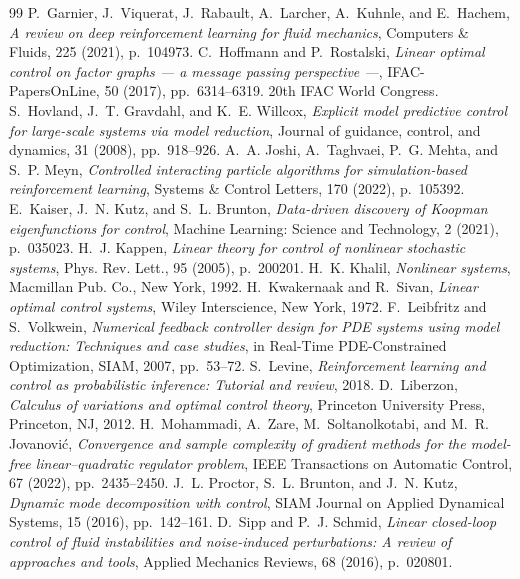 \documentclass[10pt,a4paper]{amsart}
\begin{document}
\begin{thebibliography}{99}
 {\sc P.~Garnier, J.~Viquerat, J.~Rabault, A.~Larcher, A.~Kuhnle, and E.~Hachem}, {\em A review on deep reinforcement learning for fluid mechanics}, Computers \& Fluids, 225 (2021), p.~104973.
 {\sc C.~Hoffmann and P.~Rostalski}, {\em Linear optimal control on factor graphs — a message passing perspective —}, IFAC-PapersOnLine, 50 (2017), pp.~6314--6319. \newblock 20th IFAC World Congress.
 {\sc S.~Hovland, J.~T. Gravdahl, and K.~E. Willcox}, {\em Explicit model predictive control for large-scale systems via model reduction}, Journal of guidance, control, and dynamics, 31 (2008), pp.~918--926.
 {\sc A.~A. Joshi, A.~Taghvaei, P.~G. Mehta, and S.~P. Meyn}, {\em Controlled interacting particle algorithms for simulation-based reinforcement learning}, Systems \& Control Letters, 170 (2022), p.~105392.
 {\sc E.~Kaiser, J.~N. Kutz, and S.~L. Brunton}, {\em Data-driven discovery of {K}oopman eigenfunctions for control}, Machine Learning: Science and Technology, 2 (2021), p.~035023.
 {\sc H.~J. Kappen}, {\em Linear theory for control of nonlinear stochastic systems}, Phys. Rev. Lett., 95 (2005), p.~200201.
 {\sc H.~K. Khalil}, {\em Nonlinear systems}, Macmillan Pub. Co., New York, 1992.
 {\sc H.~Kwakernaak and R.~Sivan}, {\em Linear optimal control systems}, Wiley Interscience, New York, 1972.
 {\sc F.~Leibfritz and S.~Volkwein}, {\em Numerical feedback controller design for {PDE} systems using model reduction: {T}echniques and case studies}, in Real-Time PDE-Constrained Optimization, SIAM, 2007, pp.~53--72.
 {\sc S.~Levine}, {\em Reinforcement learning and control as probabilistic inference: Tutorial and review}, 2018.
 {\sc D.~Liberzon}, {\em Calculus of variations and optimal control theory}, Princeton University Press, Princeton, NJ, 2012.
 {\sc H.~Mohammadi, A.~Zare, M.~Soltanolkotabi, and M.~R. Jovanović}, {\em Convergence and sample complexity of gradient methods for the model-free linear–quadratic regulator problem}, IEEE Transactions on Automatic Control, 67 (2022), pp.~2435--2450.
 {\sc J.~L. Proctor, S.~L. Brunton, and J.~N. Kutz}, {\em Dynamic mode decomposition with control}, SIAM Journal on Applied Dynamical Systems, 15 (2016), pp.~142--161.
 {\sc D.~Sipp and P.~J. Schmid}, {\em Linear closed-loop control of fluid instabilities and noise-induced perturbations: A review of approaches and tools}, Applied Mechanics Reviews, 68 (2016), p.~020801.

\end{thebibliography}
\end{document}
